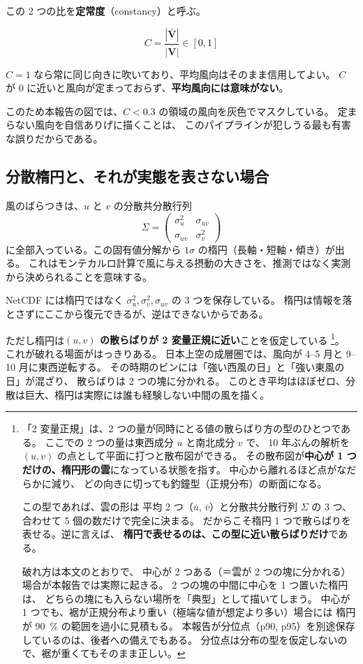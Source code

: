この 2 つの比を\textbf{定常度}（constancy）と呼ぶ。

\begin{equation}
  C = \frac{|\bar{\mathbf{V}}|}{\overline{|\mathbf{V}|}} \in [0, 1]
\end{equation}

$C = 1$ なら常に同じ向きに吹いており、平均風向はそのまま信用してよい。
$C$ が 0 に近いと風向が定まっておらず、\textbf{平均風向には意味がない}。

このため本報告の図では、$C < 0.3$ の領域の風向を灰色でマスクしている。
定まらない風向を自信ありげに描くことは、
このパイプラインが犯しうる最も有害な誤りだからである。

\subsection{分散楕円と、それが実態を表さない場合}
\label{sec:ellipse}

風のばらつきは、$u$ と $v$ の分散共分散行列
\begin{equation}
  \Sigma = \begin{pmatrix} \sigma_u^2 & \sigma_{uv} \\ \sigma_{uv} & \sigma_v^2 \end{pmatrix}
\end{equation}
に全部入っている。この固有値分解から $1\sigma$ の楕円（長軸・短軸・傾き）が出る。
これはモンテカルロ計算で風に与える摂動の大きさを、推測ではなく実測から決められることを意味する。

NetCDF には楕円ではなく $\sigma_u^2, \sigma_v^2, \sigma_{uv}$ の 3 つを保存している。
楕円は情報を落とさずにここから復元できるが、逆はできないからである。

ただし楕円は\textbf{$(u,v)$ の散らばりが 2 変量正規に近い}ことを仮定している%
\footnote{%
「2 変量正規」は、2 つの量が同時にとる値の散らばり方の型のひとつである。
ここでの 2 つの量は東西成分 $u$ と南北成分 $v$ で、
10 年ぶんの解析を $(u,v)$ の点として平面に打つと散布図ができる。
その散布図が\textbf{中心が 1 つだけの、楕円形の雲}になっている状態を指す。
中心から離れるほど点がなだらかに減り、
どの向きに切っても釣鐘型（正規分布）の断面になる。

この型であれば、雲の形は
平均 2 つ（$\bar u$, $\bar v$）と分散共分散行列 $\Sigma$ の 3 つ、
合わせて 5 個の数だけで完全に決まる。
だからこそ楕円 1 つで散らばりを表せる。逆に言えば、
\textbf{楕円で表せるのは、この型に近い散らばりだけ}である。

破れ方は本文のとおりで、
中心が 2 つある（＝雲が 2 つの塊に分かれる）場合が本報告では実際に起きる。
2 つの塊の中間に中心を 1 つ置いた楕円は、
どちらの塊にも入らない場所を「典型」として描いてしまう。
中心が 1 つでも、裾が正規分布より重い（極端な値が想定より多い）場合には
楕円が \SI{90}{\percent} の範囲を過小に見積もる。
本報告が分位点（p90, p95）を別途保存しているのは、後者への備えでもある。
分位点は分布の型を仮定しないので、裾が重くてもそのまま正しい。%
}。
これが破れる場面がはっきりある。
日本上空の成層圏では、風向が 4--5 月と 9--10 月に東西逆転する。
その時期のビンには「強い西風の日」と「強い東風の日」が混ざり、
散らばりは 2 つの塊に分かれる。
このとき平均はほぼゼロ、分散は巨大、楕円は実際には誰も経験しない中間の風を描く。

